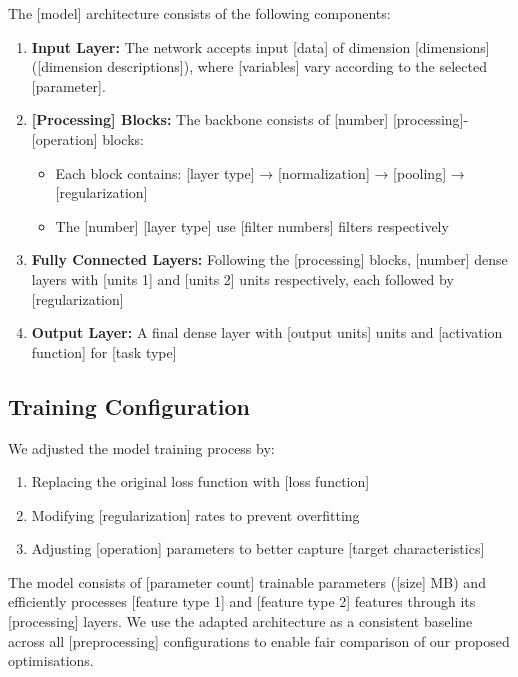 The [model] architecture consists of the following components:

\begin{enumerate}
\item \textbf{Input Layer:} The network accepts input [data] of dimension [dimensions] ([dimension descriptions]), where [variables] vary according to the selected [parameter].

\item \textbf{[Processing] Blocks:} The backbone consists of [number] [processing]-[operation] blocks:
    \begin{itemize}
    \item Each block contains: [layer type] → [normalization] → [pooling] → [regularization]
    \item The [number] [layer type] use [filter numbers] filters respectively
    \end{itemize}

\item \textbf{Fully Connected Layers:} Following the [processing] blocks, [number] dense layers with [units 1] and [units 2] units respectively, each followed by [regularization]

\item \textbf{Output Layer:} A final dense layer with [output units] units and [activation function] for [task type]
\end{enumerate}

\subsection{Training Configuration}

We adjusted the model training process by:
\begin{enumerate}
\item Replacing the original loss function with [loss function]
\item Modifying [regularization] rates to prevent overfitting
\item Adjusting [operation] parameters to better capture [target characteristics]
\end{enumerate}

The model consists of [parameter count] trainable parameters ([size] MB) and efficiently processes [feature type 1] and [feature type 2] features through its [processing] layers. We use the adapted architecture as a consistent baseline across all [preprocessing] configurations to enable fair comparison of our proposed optimisations.


